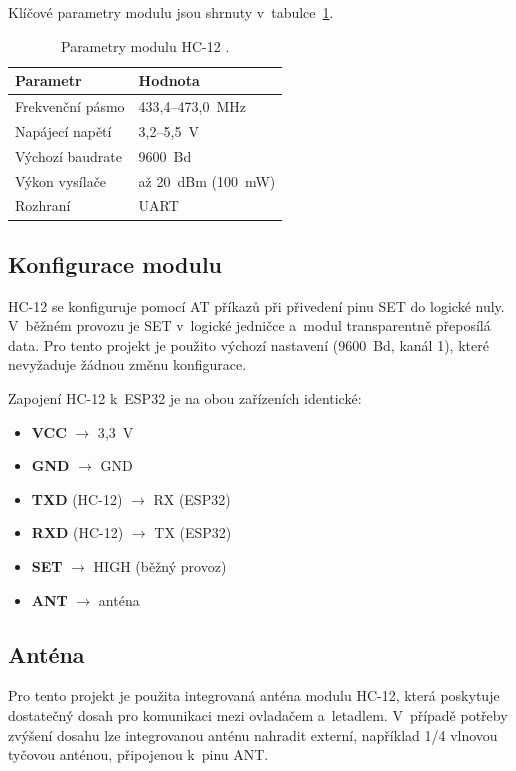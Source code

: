 \documentclass[12pt, a4paper, oneside]{report}
\begin{document}
Klíčové parametry modulu jsou shrnuty v~tabulce~\ref{tab:hc12}.

\begin{table}[H]
    \centering
    \caption{Parametry modulu HC-12 \cite{hc12}.}
    \label{tab:hc12}
    \begin{tabular}{ll}
        \toprule
        Parametr & Hodnota \\
        \midrule
        Frekvenční pásmo    & 433{,}4--473{,}0~MHz \\
        Napájecí napětí    & 3{,}2--5{,}5~V \\
        Výchozí baudrate    & 9600~Bd \\
        Výkon vysílače    & až 20~dBm (100~mW) \\
        Rozhraní    & UART \\
        \bottomrule
    \end{tabular}
\end{table}

\subsection{Konfigurace modulu}

HC-12 se konfiguruje pomocí AT příkazů při přivedení pinu SET do logické
nuly. V~běžném provozu je SET v~logické jedničce a~modul transparentně
přeposílá data. Pro tento projekt je použito výchozí nastavení
(9600~Bd, kanál 1), které nevyžaduje žádnou změnu konfigurace.

Zapojení HC-12 k~ESP32 je na obou zařízeních identické:

\begin{itemize}
    \item \textbf{VCC} $\rightarrow$ 3{,}3~V
    \item \textbf{GND} $\rightarrow$ GND
    \item \textbf{TXD} (HC-12) $\rightarrow$ RX (ESP32)
    \item \textbf{RXD} (HC-12) $\rightarrow$ TX (ESP32)
    \item \textbf{SET} $\rightarrow$ HIGH (běžný provoz)
    \item \textbf{ANT} $\rightarrow$ anténa
\end{itemize}

\subsection{Anténa}

Pro tento projekt je použita integrovaná anténa modulu HC-12,
která poskytuje dostatečný dosah pro komunikaci mezi ovladačem a~letadlem.
V~případě potřeby zvýšení dosahu lze integrovanou anténu nahradit externí,
například 1/4 vlnovou tyčovou anténou, připojenou k~pinu ANT.
\end{document}
